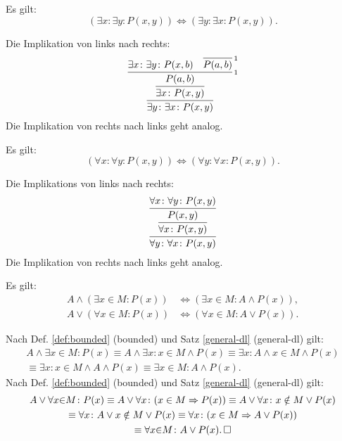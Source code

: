 \begin{Satz}\label{exists-cl}
Es gilt:
\[(\exists x\colon\exists y\colon P(x,y)) \iff (\exists y\colon\exists x\colon P(x,y)).\]
\end{Satz}
\begin{Beweis}
Die Implikation von links nach rechts:
\[\infer{\exists y\colon\exists x\colon P(x,y)}{
  \infer{\exists x\colon P(x, y)}{
    \infer[\infernote{1}]{P(a,b)}{
      \exists x\colon\exists y\colon P(x,b)
      & \infer[\infernote{1}]{P(a,b)}{}}}
}\]
Die Implikation von rechts nach links geht analog.\,\qedsymbol
\end{Beweis}

\begin{Satz}\label{all-cl}
Es gilt:
\[(\forall x\colon\forall y\colon P(x,y))
\iff (\forall y\colon\forall x\colon P(x,y)).\]
\end{Satz}
\begin{Beweis}
Die Implikations von links nach rechts:
\[\infer{\forall y\colon\forall x\colon P(x,y)}{
  \infer{\forall x\colon P(x,y)}{
    \infer{P(x,y)}{\forall x\colon\forall y\colon P(x,y)}}
}\]
Die Implikation von rechts nach links geht analog.\,\qedsymbol
\end{Beweis}

\begin{Satz}%
\label{bounded-general-dl}
Es gilt:
\begin{align}
A\land (\exists x{\in}M\colon P(x)) &\iff (\exists x{\in}M\colon A\land P(x)),\\
A\lor (\forall x{\in}M\colon P(x)) &\iff (\forall x{\in}M\colon A\lor P(x)).
\end{align}
\end{Satz}

\begin{Beweis}
Nach Def. \ref{def:bounded} (bounded)
und Satz \ref{general-dl} (general-dl) gilt:
\begin{gather*}
A\land \exists x{\in}M\colon P(x)
\equiv A\land \exists x\colon x\in M\land P(x)
\equiv \exists x\colon A\land x\in M\land P(x)\\
\equiv \exists x\colon x\in M\land A\land P(x)
\equiv \exists x{\in}M\colon A\land P(x).
\end{gather*}
Nach Def. \ref{def:bounded} (bounded)
und Satz \ref{general-dl} (general-dl) gilt:
\begin{gather*}
A\lor\forall x{\in}M\colon P(x)
\equiv A\lor\forall x\colon (x\in M\Rightarrow P(x))
\equiv A\lor\forall x\colon x\notin M\lor P(x)\\
\equiv \forall x\colon A\lor x\notin M\lor P(x)
\equiv \forall x\colon (x\in M\Rightarrow A\lor P(x))\\
\equiv \forall x{\in}M\colon A\lor P(x).\,\square
\end{gather*}
\end{Beweis}

